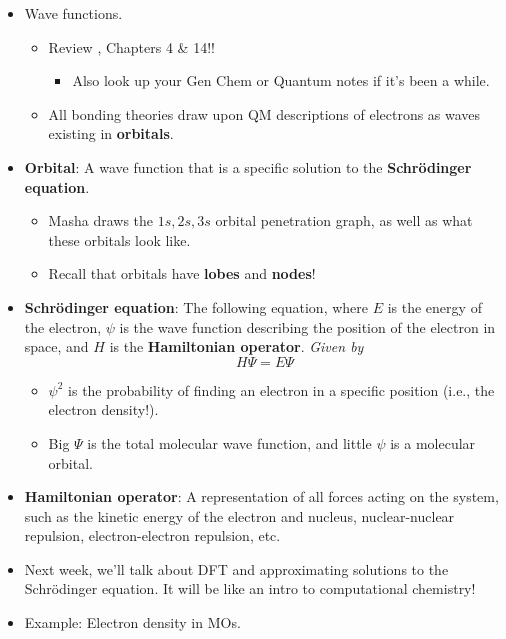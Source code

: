 \documentclass[../notes.tex]{subfiles}
\begin{document}
\begin{itemize}
    \item Wave functions.
    \begin{itemize}
        \item Review \textcite{bib:Anslyn}, Chapters 4 \& 14!!
        \begin{itemize}
            \item Also look up your Gen Chem or Quantum notes if it's been a while.
        \end{itemize}
        \item All bonding theories draw upon QM descriptions of electrons as waves existing in \textbf{orbitals}.
    \end{itemize}
    \item \textbf{Orbital}: A wave function that is a specific solution to the \textbf{Schr\"{o}dinger equation}.
    \begin{itemize}
        \item Masha draws the $1s,2s,3s$ orbital penetration graph, as well as what these orbitals look like.
        \item Recall that orbitals have \textbf{lobes} and \textbf{nodes}!
    \end{itemize}
    \item \textbf{Schr\"{o}dinger equation}: The following equation, where $E$ is the energy of the electron, $\psi$ is the wave function describing the position of the electron in space, and $H$ is the \textbf{Hamiltonian operator}. \emph{Given by}
    \begin{equation*}
        H\Psi = E\Psi
    \end{equation*}
    \begin{itemize}
        \item $\psi^2$ is the probability of finding an electron in a specific position (i.e., the electron density!).
        \item Big $\Psi$ is the total molecular wave function, and little $\psi$ is a molecular orbital.
    \end{itemize}
    \item \textbf{Hamiltonian operator}: A representation of all forces acting on the system, such as the kinetic energy of the electron and nucleus, nuclear-nuclear repulsion, electron-electron repulsion, etc.
    \item Next week, we'll talk about DFT and approximating solutions to the Schr\"{o}dinger equation. It will be like an intro to computational chemistry!
    \item Example: Electron density in  MOs.

\end{itemize}
\end{document}
